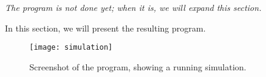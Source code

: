 \textit{The program is not done yet; when it is, we will expand this section.}

In this section, we will present the resulting program.

\begin{figure}
  \begin{center}
    \texttt{[image: simulation]}
    \caption{Screenshot of the program, showing a running simulation.}
    \label{fig:simulation}
  \end{center}
\end{figure}
